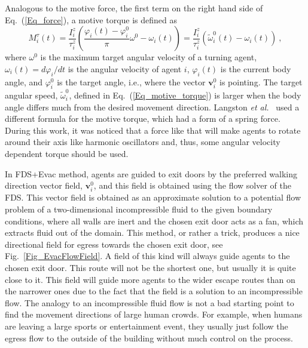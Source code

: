 \documentclass[12pt,a4paper,final,twoside]{stylevk}
\begin{document}
Analogous to the motive force, the first term on the right hand
side of Eq.~(\ref{Eq_force}), a motive torque is defined as
%
\begin{equation}\label{Eq_motive_torque}
  {M}^{\tau}_{i}  (t) = \frac{ I^z_{i} }{ \tau^z_{i} } \left(
  \frac{ \varphi_i(t) - \varphi^0_{i} }{\pi} \omega^0 - \omega_i(t)
  \right) = \frac{ I^z_{i} }{ \tau^z_{i} } \left( \tilde \omega^0_i
  (t) -  \omega_i (t) \right) ~, 
\end{equation}
%
where $\omega^0 $ is the maximum target angular velocity of a turning
agent, $\omega_i (t) = d\varphi_i/dt$ is the angular velocity of agent
$i$, $\varphi_i(t)$ is the current body angle, and $\varphi^0_{i}$ is
the target angle, i.e., where the vector $ \mathbf{v}_i^0 $ is
pointing.  The target angular speed, $\tilde \omega^0_i$, defined in
Eq.~(\ref{Eq_motive_torque}) is larger when the body angle differs
much from the desired movement direction.  Langston {\em et
  al.}~\cite{Langston06} used a different formula for the motive
torque, which had a form of a spring force.  During this work, it was
noticed that a force like that will make agents to rotate around their
axis like harmonic oscillators and, thus, some angular velocity
dependent torque should be used.


In FDS+Evac method, agents are guided to exit doors by the preferred
walking direction vector field, $ \mathbf{v}_i^0$, and this field is
obtained using the flow solver of the FDS.  This vector field is
obtained as an approximate solution to a potential flow problem of a
two-dimensional incompressible fluid to the given boundary conditions,
where all walls are inert and the chosen exit door acts as a fan,
which extracts fluid out of the domain.  This method, or rather a
trick, produces a nice directional field for egress towards the chosen
exit door, see Fig.~\ref{Fig_EvacFlowField}.  A field of this kind
will always guide agents to the chosen exit door.  This route will not
be the shortest one, but usually it is quite close to it.  This field
will guide more agents to the wider escape routes than on the narrower
ones due to the fact that the field is a solution to an incompressible
flow.  The analogy to an incompressible fluid flow is not a bad
starting point to find the movement directions of large human crowds.
For example, when humans are leaving a large sports or entertainment
event, they usually just follow the egress flow to the outside of the
building without much control on the process.
\end{document}
